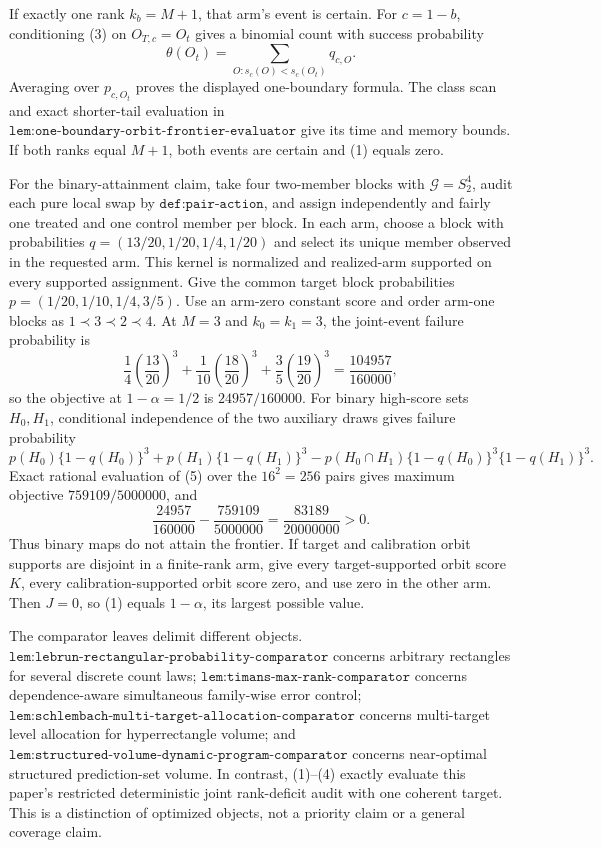 If exactly one rank \(k_b=M+1\), that arm's event is certain. For \(c=1-b\), conditioning (3) on \(O_{T,c}=O_t\) gives a binomial count with success probability
\[
\theta(O_t)=\sum_{O:s_c(O)<s_c(O_t)}q_{c,O}.
\]
Averaging over \(p_{c,O_t}\) proves the displayed one-boundary formula. The class scan and exact shorter-tail evaluation in \(\texttt{lem:one-boundary-orbit-frontier-evaluator}\) give its time and memory bounds. If both ranks equal \(M+1\), both events are certain and (1) equals zero.

For the binary-attainment claim, take four two-member blocks with \(\mathcal G=S_2^4\), audit each pure local swap by \(\texttt{def:pair-action}\), and assign independently and fairly one treated and one control member per block. In each arm, choose a block with probabilities \(q=(13/20,1/20,1/4,1/20)\) and select its unique member observed in the requested arm. This kernel is normalized and realized-arm supported on every supported assignment. Give the common target block probabilities \(p=(1/20,1/10,1/4,3/5)\). Use an arm-zero constant score and order arm-one blocks as \(1\prec3\prec2\prec4\). At \(M=3\) and \(k_0=k_1=3\), the joint-event failure probability is
\[
\frac14\left(\frac{13}{20}\right)^3+\frac1{10}\left(\frac{18}{20}\right)^3+\frac35\left(\frac{19}{20}\right)^3=\frac{104957}{160000},
\]
so the objective at \(1-\alpha=1/2\) is \(24957/160000\). For binary high-score sets \(H_0,H_1\), conditional independence of the two auxiliary draws gives failure probability
\[
p(H_0)\{1-q(H_0)\}^3+p(H_1)\{1-q(H_1)\}^3-p(H_0\cap H_1)\{1-q(H_0)\}^3\{1-q(H_1)\}^3.
\tag{5}
\]
Exact rational evaluation of (5) over the \(16^2=256\) pairs gives maximum objective \(759109/5000000\), and
\[
\frac{24957}{160000}-\frac{759109}{5000000}=\frac{83189}{20000000}>0.
\]
Thus binary maps do not attain the frontier. If target and calibration orbit supports are disjoint in a finite-rank arm, give every target-supported orbit score \(K\), every calibration-supported orbit score zero, and use zero in the other arm. Then \(J=0\), so (1) equals \(1-\alpha\), its largest possible value.

The comparator leaves delimit different objects. \(\texttt{lem:lebrun-rectangular-probability-comparator}\) concerns arbitrary rectangles for several discrete count laws; \(\texttt{lem:timans-max-rank-comparator}\) concerns dependence-aware simultaneous family-wise error control; \(\texttt{lem:schlembach-multi-target-allocation-comparator}\) concerns multi-target level allocation for hyperrectangle volume; and \(\texttt{lem:structured-volume-dynamic-program-comparator}\) concerns near-optimal structured prediction-set volume. In contrast, (1)--(4) exactly evaluate this paper's restricted deterministic joint rank-deficit audit with one coherent target. This is a distinction of optimized objects, not a priority claim or a general coverage claim.

